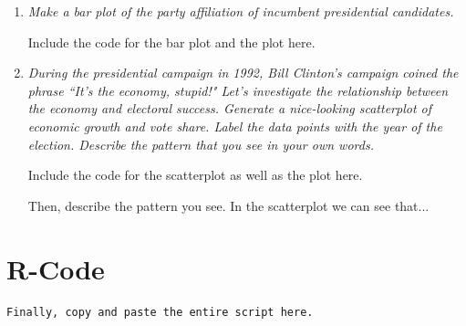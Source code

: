 \documentclass[a4paper,12pt]{article} %
\begin{document}
\begin{enumerate}
\newpage
\item {\it Make a bar plot of the party affiliation of incumbent presidential candidates.}

Include the code for the bar plot and the plot here. %

\newpage
\item  {\it During the presidential campaign in 1992, Bill Clinton's campaign coined the phrase ``It's the economy, stupid!" Let's investigate the relationship between the economy and electoral success. Generate a nice-looking scatterplot of economic growth and vote share. Label the data points with the year of the election. Describe the pattern that you see in your own words.}

Include the code for the scatterplot as well as the plot here.

Then, describe the pattern you see. In the scatterplot we can see that... 

\end{enumerate}

\clearpage
\section*{R-Code}

\begin{verbatim}
Finally, copy and paste the entire script here.

\end{verbatim}
\end{document}
